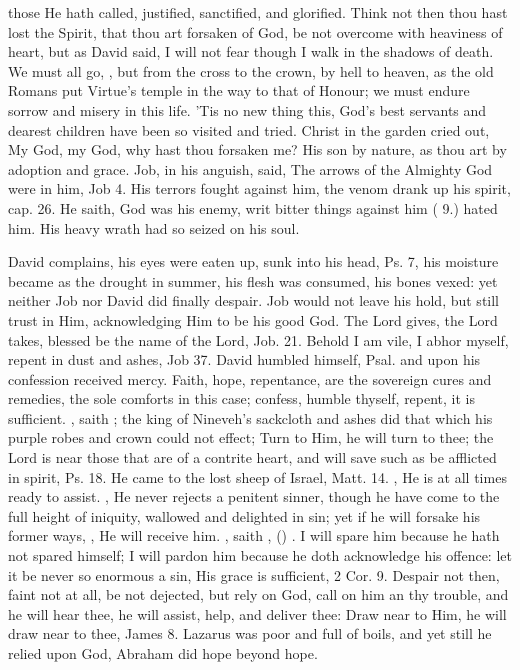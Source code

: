 {those He hath called, justified, sanctified, and glorified. Think not
then thou hast lost the Spirit, that thou art forsaken of God, be not
overcome with heaviness of heart, but as David said, I will not fear
though I walk in the shadows of death. We must all go, , but from the cross to the crown, by hell to heaven,
as the old Romans put Virtue's temple in the way to that of Honour; we
must endure sorrow and misery in this life. 'Tis no new thing this,
God's best servants and dearest children have been so visited and
tried. Christ in the garden cried out, My God, my God, why hast thou
forsaken me? His son by nature, as thou art by adoption and grace. Job,
in his anguish, said, The arrows of the Almighty God were in him, Job
 4. His terrors fought against him, the venom drank up his spirit,
cap.  26. He saith, God was his enemy, writ bitter things against
him ( 9.) hated him. His heavy wrath had so seized on his soul.

David complains, his eyes were eaten up, sunk into his head, Ps.  7,
his moisture became as the drought in summer, his flesh was consumed,
his bones vexed: yet neither Job nor David did finally despair. Job
would not leave his hold, but still trust in Him, acknowledging Him to
be his good God. The Lord gives, the Lord takes, blessed be the name of
the Lord, Job.  21. Behold I am vile, I abhor myself, repent in dust
and ashes, Job  37. David humbled himself, Psal.  and upon
his confession received mercy. Faith, hope, repentance, are the
sovereign cures and remedies, the sole comforts in this case; confess,
humble thyself, repent, it is sufficient. , saith \Chrysostom{}; the king of Nineveh's sackcloth and
ashes did that which his purple robes and crown could not effect;  Turn to Him, he will turn to thee;
the Lord is near those that are of a contrite heart, and will save such
as be afflicted in spirit, Ps.  18. He came to the lost sheep of
Israel, Matt.  14. ,
He is at all times ready to assist. , He never rejects a penitent
sinner, though he have come to the full height of iniquity, wallowed
and delighted in sin; yet if he will forsake his former ways, , He will receive him. , saith
\Austin{}, () . I will spare him because he hath not spared
himself; I will pardon him because he doth acknowledge his offence: let
it be never so enormous a sin, His grace is sufficient, 2 Cor.  9.
Despair not then, faint not at all, be not dejected, but rely on God,
call on him an thy trouble, and he will hear thee, he will assist,
help, and deliver thee: Draw near to Him, he will draw near to thee,
James  8. Lazarus was poor and full of boils, and yet still he
relied upon God, Abraham did hope beyond hope.

}
